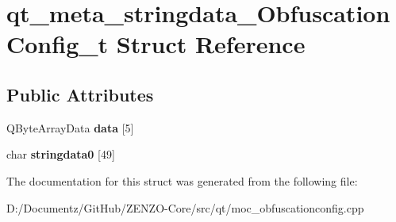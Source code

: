 \hypertarget{structqt__meta__stringdata___obfuscation_config__t}{}\section{qt\+\_\+meta\+\_\+stringdata\+\_\+\+Obfuscation\+Config\+\_\+t Struct Reference}
\label{structqt__meta__stringdata___obfuscation_config__t}
\subsection*{Public Attributes}
\begin{DoxyCompactItemize}
\item 
\mbox{\label{structqt__meta__stringdata___obfuscation_config__t_ad6708b8c2d9d06ab7d86e900184873c9}} 
Q\+Byte\+Array\+Data {\bfseries data} \mbox{[}5\mbox{]}
\item 
\mbox{\label{structqt__meta__stringdata___obfuscation_config__t_a220af862e66ed465ca49e5d8634140e2}} 
char {\bfseries stringdata0} \mbox{[}49\mbox{]}
\end{DoxyCompactItemize}


The documentation for this struct was generated from the following file\+:\begin{DoxyCompactItemize}
\item 
D\+:/\+Documentz/\+Git\+Hub/\+Z\+E\+N\+Z\+O-\/\+Core/src/qt/moc\+\_\+obfuscationconfig.\+cpp\end{DoxyCompactItemize}
